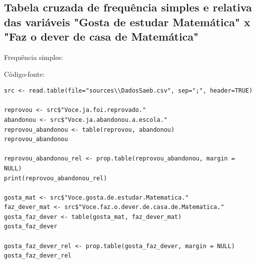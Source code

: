 \documentclass[17pt]{extarticle}
\begin{document}
\subsection{Tabela cruzada de frequência simples e relativa das variáveis "Gosta de estudar Matemática" x "Faz o dever de casa de Matemática"}
Frequência simples:
\begin{table}[H]
\end{table}
\begin{table}[H]
\end{table}
Código-fonte:
\begin{lstlisting}
src <- read.table(file="sources\\DadosSaeb.csv", sep=";", header=TRUE)

reprovou <- src$"Voce.ja.foi.reprovado."
abandonou <- src$"Voce.ja.abandonou.a.escola."
reprovou_abandonou <- table(reprovou, abandonou)
reprovou_abandonou

reprovou_abandonou_rel <- prop.table(reprovou_abandonou, margin = NULL)
print(reprovou_abandonou_rel)

gosta_mat <- src$"Voce.gosta.de.estudar.Matematica."
faz_dever_mat <- src$"Voce.faz.o.dever.de.casa.de.Matematica."
gosta_faz_dever <- table(gosta_mat, faz_dever_mat)
gosta_faz_dever

gosta_faz_dever_rel <- prop.table(gosta_faz_dever, margin = NULL)
gosta_faz_dever_rel

\end{lstlisting}
\end{document}
